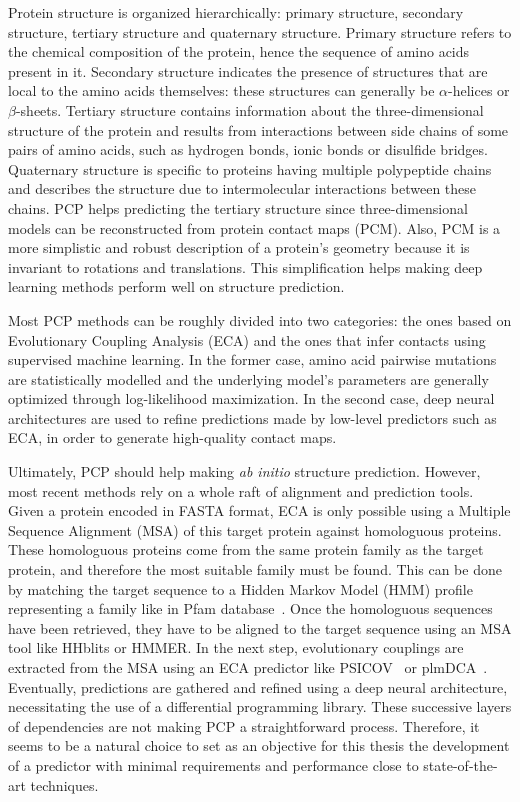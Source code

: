     Protein structure is organized hierarchically: primary structure, secondary structure, tertiary structure
    and quaternary structure. Primary structure refers to the chemical composition of the protein, hence the sequence of amino acids present in it.
    Secondary structure indicates the presence of structures that are local to the amino acids themselves: these structures can generally be $\alpha$-helices
    or $\beta$-sheets. Tertiary structure contains information about the three-dimensional structure of the protein and results from interactions
    between side chains of some pairs of amino acids, such as hydrogen bonds, ionic bonds or disulfide bridges.
    Quaternary structure is specific to proteins having multiple polypeptide chains and describes the structure due to intermolecular interactions between
    these chains. PCP helps predicting the tertiary structure since three-dimensional models can be reconstructed from protein contact maps (PCM).
    Also, PCM is a more simplistic and robust description of a protein's geometry because it is invariant to rotations and translations.
    This simplification helps making deep learning methods perform well on structure prediction.

    Most PCP methods can be roughly divided into two categories:
    the ones based on Evolutionary Coupling Analysis (ECA) and the ones that infer contacts using
    supervised machine learning. In the former case, amino acid pairwise mutations are statistically modelled and the underlying model's parameters
    are generally optimized through log-likelihood maximization. In the second case, deep neural architectures are used to
    refine predictions made by low-level predictors such as ECA, in order to generate high-quality contact maps.

    Ultimately, PCP should help making \textit{ab initio} structure prediction.
    However, most recent methods rely on a whole raft of alignment and prediction tools.
    Given a protein encoded in FASTA format, ECA is only possible using a Multiple Sequence Alignment (MSA)
    of this target protein against homologuous proteins. These homologuous proteins come from the same protein family
    as the target protein, and therefore the most suitable family must be found.
    This can be done by matching the target sequence to a Hidden Markov Model (HMM) profile representing a family
    like in Pfam database~\cite{Pfam}. Once the homologuous sequences have been retrieved, they have to be aligned to
    the target sequence using an MSA tool like HHblits or HMMER. In the next step, evolutionary couplings are extracted from
    the MSA using an ECA predictor like PSICOV~\cite{doi:10.1093/bioinformatics/btr638} or plmDCA~\cite{EKEBERG2014341}.
    Eventually, predictions are gathered and refined using a deep neural architecture, necessitating the use
    of a differential programming library. These successive layers of dependencies are not making PCP a straightforward process.
    Therefore, it seems to be a natural choice to set as an objective for this thesis the development of a predictor with
    minimal requirements and performance close to state-of-the-art techniques.

